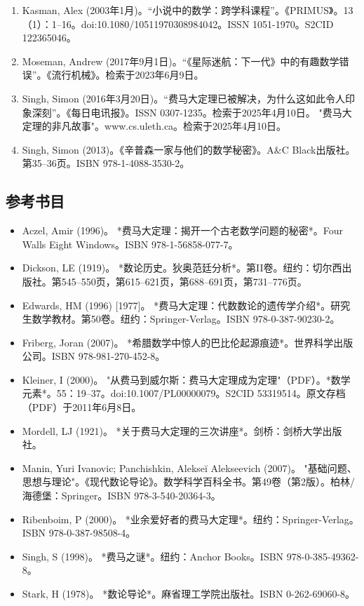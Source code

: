 \begin{enumerate}
\item Kasman, Alex (2003年1月)。“小说中的数学：跨学科课程”。《PRIMUS》。13（1）：1–16。doi:10.1080/10511970308984042。ISSN 1051-1970。S2CID 122365046。  
\item Moseman, Andrew (2017年9月1日)。“《星际迷航：下一代》中的有趣数学错误”。《流行机械》。检索于2023年6月9日。  
\item Singh, Simon (2016年3月20日)。“费马大定理已被解决，为什么这如此令人印象深刻”。《每日电讯报》。ISSN 0307-1235。检索于2025年4月10日。  
"费马大定理的非凡故事"。www.cs.uleth.ca。检索于2025年4月10日。  
\item Singh, Simon (2013)。《辛普森一家与他们的数学秘密》。A&C Black出版社。第35–36页。ISBN 978-1-4088-3530-2。
\end{enumerate}
\subsection{参考书目} 
\begin{itemize}
\item Aczel, Amir (1996)。 *费马大定理：揭开一个古老数学问题的秘密*。Four Walls Eight Windows。ISBN 978-1-56858-077-7。  
\item Dickson, LE (1919)。 *数论历史。狄奥范廷分析*。第II卷。纽约：切尔西出版社。第545–550页，第615–621页，第688–691页，第731–776页。  
\item Edwards, HM (1996) [1977]。 *费马大定理：代数数论的遗传学介绍*。研究生数学教材。第50卷。纽约：Springer-Verlag。ISBN 978-0-387-90230-2。  
\item Friberg, Joran (2007)。 *希腊数学中惊人的巴比伦起源痕迹*。世界科学出版公司。ISBN 978-981-270-452-8。  
\item Kleiner, I (2000)。 "从费马到威尔斯：费马大定理成为定理"（PDF）。*数学元素*。55：19–37。doi:10.1007/PL00000079。S2CID 53319514。原文存档（PDF）于2011年6月8日。  
\item Mordell, LJ (1921)。 *关于费马大定理的三次讲座*。剑桥：剑桥大学出版社。  
\item Manin, Yuri Ivanovic; Panchishkin, Alekseĭ Alekseevich (2007)。 "基础问题、思想与理论"。《现代数论导论》。数学科学百科全书。第49卷（第2版）。柏林/海德堡：Springer。ISBN 978-3-540-20364-3。  
\item Ribenboim, P (2000)。 *业余爱好者的费马大定理*。纽约：Springer-Verlag。ISBN 978-0-387-98508-4。  
\item Singh, S (1998)。 *费马之谜*。纽约：Anchor Books。ISBN 978-0-385-49362-8。  
\item Stark, H (1978)。 *数论导论*。麻省理工学院出版社。ISBN 0-262-69060-8。
\end{itemize}
